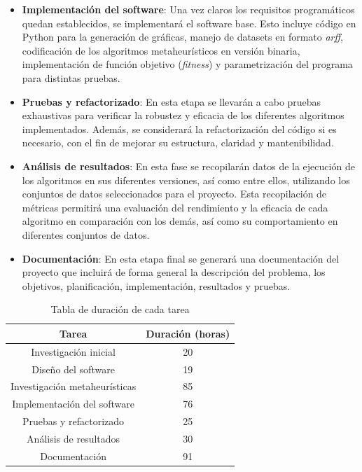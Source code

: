 \begin{itemize}
      \item \textbf{Implementación del software}: Una vez claros los requisitos programáticos quedan establecidos, se implementará el software base. Esto incluye código en Python para la generación de gráficas, manejo de datasets en formato \textit{arff}, codificación de los algoritmos metaheurísticos en versión binaria, implementación de función objetivo (\textit{fitness}) y parametrización del programa para distintas pruebas.
      \item \textbf{Pruebas y refactorizado}: En esta etapa se llevarán a cabo pruebas exhaustivas para verificar la robustez y eficacia de los diferentes algoritmos implementados. Además, se considerará la refactorización del código si es necesario, con el fin de mejorar su estructura, claridad y mantenibilidad.
      \item \textbf{Análisis de resultados}: En esta fase se recopilarán datos de la ejecución de los algoritmos en sus diferentes versiones, así como entre ellos, utilizando los conjuntos de datos seleccionados para el proyecto. Esta recopilación de métricas permitirá una evaluación del rendimiento y la eficacia de cada algoritmo en comparación con los demás, así como su comportamiento en diferentes conjuntos de datos.
      \item \textbf{Documentación}: En esta etapa final se generará una documentación del proyecto que incluirá de forma general la descripción del problema, los objetivos, planificación, implementación, resultados y pruebas.
\end{itemize}

\begin{table}[H]
      \centering
      \begin{tabular}{c|c}
            Tarea                         & Duración (horas) \\ \hline
            Investigación inicial         & 20 \\
            Diseño del software           & 19 \\
            Investigación metaheurísticas & 85 \\
            Implementación del software   & 76 \\
            Pruebas y refactorizado       & 25 \\
            Análisis de resultados        & 30 \\
            Documentación                 & 91 \\ \hline
      \end{tabular}
      \caption{Tabla de duración de cada tarea}
\end{table}

